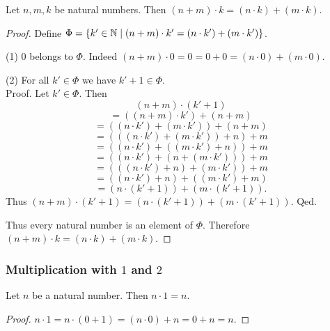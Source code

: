 \documentclass[10pt]{article}
\begin{document}
  \begin{forthel}
    \begin{proposition}
      Let $n, m, k$ be natural numbers.
      Then $(n + m) \cdot k = (n \cdot k) + (m \cdot k)$.
    \end{proposition}
    \begin{proof}
      Define $\Phi = \{ k' \in \mathbb{N} \mid (n + m) \cdot k' = (n \cdot k') + (m \cdot k') \}$.

      (1) $0$ belongs to $\Phi$.
      Indeed $(n + m) \cdot 0
        = 0
        = 0 + 0
        = (n \cdot 0) + (m \cdot 0)$.

      (2) For all $k' \in \Phi$ we have $k' + 1 \in \Phi$. \\
      Proof.
        Let $k' \in \Phi$.
        Then
        \[  (n + m) \cdot (k' + 1)                        \]
        \[    = ((n + m) \cdot k') + (n + m)              \]
        \[    = ((n \cdot k') + (m \cdot k')) + (n + m)   \]
        \[    = (((n \cdot k') + (m \cdot k')) + n) + m   \]
        \[    = ((n \cdot k') + ((m \cdot k') + n)) + m   \]
        \[    = ((n \cdot k') + (n + (m \cdot k'))) + m   \]
        \[    = (((n \cdot k') + n) + (m \cdot k')) + m   \]
        \[    = ((n \cdot k') + n) + ((m \cdot k') + m)   \]
        \[    = (n \cdot (k' + 1)) + (m \cdot (k' + 1)).  \]
        Thus $(n + m) \cdot (k' + 1) = (n \cdot (k' + 1)) + (m \cdot (k' + 1))$.
      Qed.

      Thus every natural number is an element of $\Phi$.
      Therefore $(n + m) \cdot k = (n \cdot k) + (m \cdot k)$.
    \end{proof}
  \end{forthel}


  \subsubsection*{Multiplication with $1$ and $2$}

  \begin{forthel}
    \begin{proposition}
      Let $n$ be a natural number.
      Then $n \cdot 1 = n$.
    \end{proposition}
    \begin{proof}
      $n \cdot 1
        = n \cdot (0 + 1)
        = (n \cdot 0) + n
        = 0 + n
        = n$.
    \end{proof}
  \end{forthel}
\end{document}
